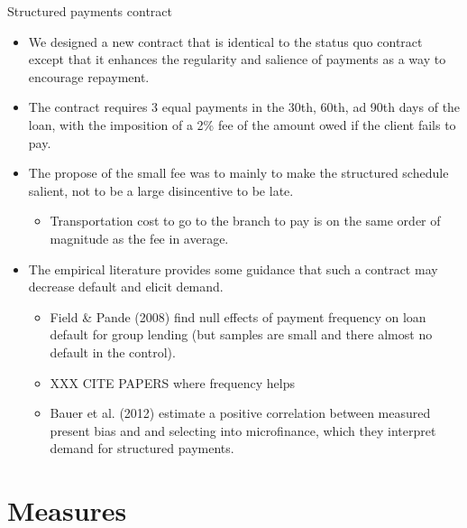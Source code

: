 \documentclass[8pt]{beamer}
\begin{document}
\begin{frame}{Structured payments contract}
   \begin{itemize}
       \vfill \item We designed a new contract that is identical to the status quo contract except that it enhances the regularity and salience of payments as a way to encourage repayment.
       \vfill\item The contract requires 3 equal payments in the 30th, 60th, ad 90th days of the loan, with the imposition of a 2\% fee of the amount owed if the client fails to pay.
       \vfill\item The propose of the small fee was to mainly to make the structured schedule salient, not to be a large disincentive to be late. 
       \begin{itemize}
           \item Transportation cost to go to the branch to pay is on the same order of magnitude as the fee in average.
       \end{itemize}
       \vfill\item  The empirical literature provides some guidance that such a contract may decrease default and elicit demand.
       \begin{itemize}
           \item Field \& Pande (2008) find null effects of payment frequency on loan default for group lending (but samples are small and there almost no default in the control). 
           \item XXX CITE PAPERS where frequency helps
        \item  Bauer et al. (2012) estimate a positive correlation between measured present bias and and selecting into microfinance, which they interpret demand for structured payments.
       \end{itemize}
       
   \end{itemize}
    
\end{frame}


\section{Measures}
\end{document}
